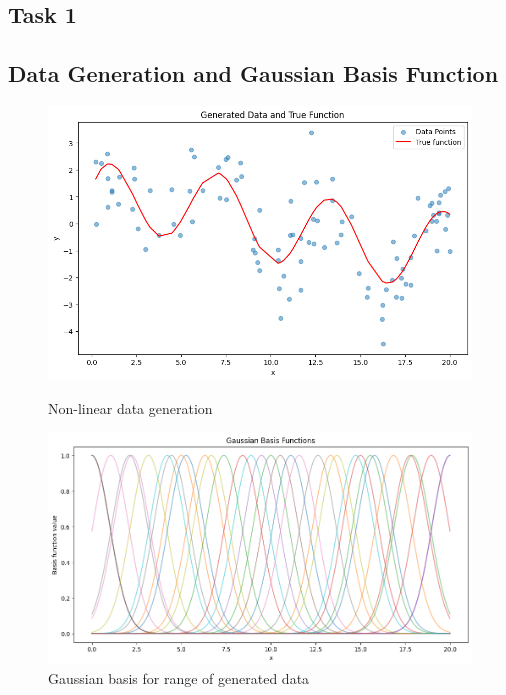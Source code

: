 \documentclass{article}
\begin{document}
\begin{appendices}


\section{Task 1}

\subsection{Data Generation and Gaussian Basis Function} \label{app:loss-history-sgd}

\begin{figure}[h]
    \centering
    \begin{minipage}{0.45\textwidth}
        \centering
        \includegraphics[width=\textwidth]{figures/data.png} 
        \caption{Non-linear data generation}
        \label{data}
    \end{minipage}\hfill
    \begin{minipage}{0.55\textwidth}
        \centering
        \includegraphics[width=\textwidth]{figures/gaussian_basis.png} 
        \caption{Gaussian basis for range of generated data}
        \label{gaussian}
    \end{minipage}
\end{figure}


\end{appendices}
\end{document}
